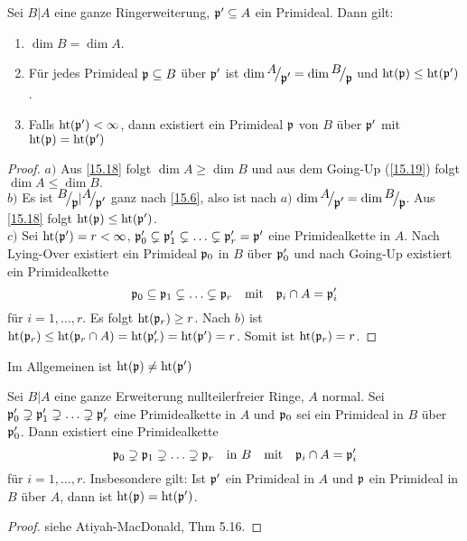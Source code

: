 \begin{sa}
	Sei $B|A$ eine ganze Ringerweiterung, $\mathfrak{p}'\subseteq A$ ein Primideal. Dann gilt:
	\begin{enumerate}[label= \alph*)]
		\item $\dim B = \dim A$.
		\item Für jedes Primideal $\mathfrak{p}\subseteq B$ über $\mathfrak{p}'$ ist $\dim \QR{A}{\p'} = \dim \QR{B}{\p}$ und $\text{ht}(\mathfrak{p}) \leq \text{ht}(\mathfrak{p}')$.
		\item Falls $\text{ht}(\mathfrak{p}')< \infty$, dann existiert ein Primideal $\mathfrak{p}$ von $B$ über $\mathfrak{p}'$ mit $\text{ht}(\mathfrak{p}) = \text{ht}(\mathfrak{p}')$
	\end{enumerate}
\end{sa}
\begin{proof}
	$a)$ Aus \ref{15.18} folgt $\dim A \geq \dim B$ und aus dem Going-Up (\ref{15.19}) folgt $\dim A \leq \dim B. $\\
	$b)$ Es ist $\QR{B}{\p} | \QR{A}{\p'}$ ganz nach \ref{15.6}, also ist nach $a)$ $\dim \QR{A}{\p'} = \dim \QR{B}{\p}$. Aus \ref{15.18} folgt $\text{ht}(\mathfrak{p}) \leq \text{ht}(\mathfrak{p}')$.\\
	$c)$ Sei $\text{ht}(\mathfrak{p}')=r < \infty$, $\mathfrak{p}_0'\subsetneq \mathfrak{p}_1' \subsetneq \ldots \subsetneq \mathfrak{p}_r' = \mathfrak{p}'$ eine Primidealkette in $A$. Nach Lying-Over existiert ein Primideal $\mathfrak{p}_0$ in $B$ über $\mathfrak{p}_0'$ und nach Going-Up existiert ein Primidealkette 
	$$\mathfrak{p}_0\subseteq \mathfrak{p}_1 \subsetneq \ldots \subsetneq \mathfrak{p}_r \quad \text{mit} \quad \mathfrak{p}_i \cap A = \mathfrak{p}_i'$$
	für $i=1, \ldots, r$. Es folgt $\text{ht}(\mathfrak{p}_r)\geq r$. Nach $b)$ ist $\text{ht}(\mathfrak{p}_r) \leq \text{ht}(\mathfrak{p}_r \cap A) =\text{ht}(\mathfrak{p}_r') = \text{ht}(\mathfrak{p}') =r$. Somit ist $\text{ht}(\mathfrak{p}_r) = r$. 
\end{proof}
\begin{anm}
	Im Allgemeinen ist $\text{ht}(\mathfrak{p}) \neq \text{ht}(\mathfrak{p}')$
\end{anm}
\begin{sa}
	Sei $B|A$ eine ganze Erweiterung nullteilerfreier Ringe, $A$ normal. Sei $\mathfrak{p}_0'\supsetneq \mathfrak{p}_1'\supsetneq \ldots \supsetneq \mathfrak{p}_r'$ eine Primidealkette in $A$ und $\mathfrak{p}_0$ sei ein Primideal in $B$ über $\mathfrak{p}_0'$. Dann existiert eine Primidealkette
	$$\mathfrak{p}_0\supsetneq \mathfrak{p}_1\supsetneq \ldots \supsetneq \mathfrak{p}_r \quad \text{in }B \quad \text{mit} \quad \mathfrak{p}_i \cap A = \mathfrak{p}_i'$$
	für $i=1, \ldots, r$. Insbesondere gilt: Ist $\mathfrak{p}'$ ein Primideal in $A$ und $\mathfrak{p}$ ein Primideal in $B$ über $A$, dann ist $\text{ht}(\mathfrak{p}) = \text{ht}(\mathfrak{p}')$.
\end{sa}
\begin{proof}
	siehe Atiyah-MacDonald, Thm 5.16.
\end{proof}
\newpage
